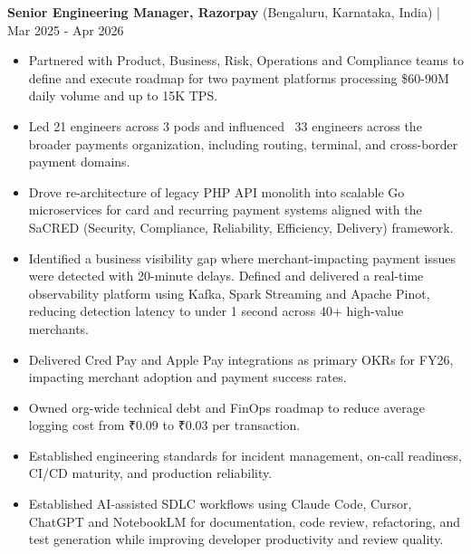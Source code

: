\documentclass[11pt,a4paper]{article}
\begin{document}
\textbf{Senior Engineering Manager, Razorpay} (Bengaluru, Karnataka, India) | Mar 2025 - Apr 2026 \\
\begin{itemize}[leftmargin=*]
    \item Partnered with Product, Business, Risk, Operations and Compliance teams to define and execute roadmap for two payment platforms processing \$60-90M daily volume and up to 15K TPS.
    \item Led 21 engineers across 3 pods and influenced ~33 engineers across the broader payments organization, including routing, terminal, and cross-border payment domains.
    \item Drove re-architecture of legacy PHP API monolith into scalable Go microservices for card and recurring payment systems aligned with the SaCRED (Security, Compliance, Reliability, Efficiency, Delivery) framework.
    \item Identified a business visibility gap where merchant-impacting payment issues were detected with 20-minute delays. Defined and delivered a real-time observability platform using Kafka, Spark Streaming and Apache Pinot, reducing detection latency to under 1 second across 40+ high-value merchants.
    \item Delivered Cred Pay and Apple Pay integrations as primary OKRs for FY26, impacting merchant adoption and payment success rates.
    \item Owned org-wide technical debt and FinOps roadmap to reduce average logging cost from ₹0.09 to ₹0.03 per transaction.
    \item Established engineering standards for incident management, on-call readiness, CI/CD maturity, and production reliability.
    \item Established AI-assisted SDLC workflows using Claude Code, Cursor, ChatGPT and NotebookLM for documentation, code review, refactoring, and test generation while improving developer productivity and review quality.
\end{itemize}

\vspace{4pt}
\end{document}
